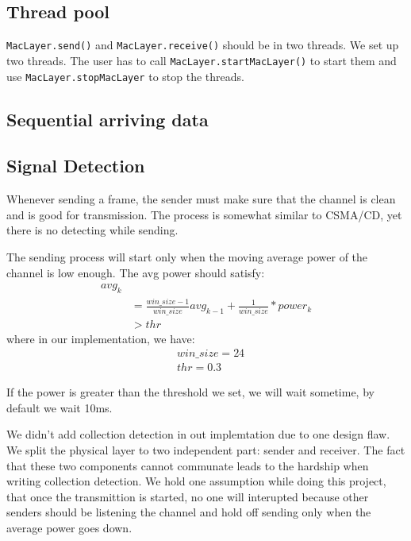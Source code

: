 \documentclass[conference,compsoc]{IEEEtran}
\begin{document}
	\subsection{Thread pool}\label{Thread pool}
		\lstinline{MacLayer.send()} and \lstinline{MacLayer.receive()} should be in two threads. We set up two threads. 
		The user has to call \lstinline{MacLayer.startMacLayer()} to start them and use \lstinline{MacLayer.stopMacLayer} to stop the threads.
	
	\subsection{Sequential arriving data}
	
	\subsection{Signal Detection}
		Whenever sending a frame, the sender must make sure that the channel is clean and is good for transmission.
		The process is somewhat similar to CSMA/CD, yet there is no detecting while sending.
		\par
		The sending process will start only when the moving average power of the channel is low enough. The avg power should satisfy:
		\begin{equation}\begin{aligned}
		avg_k \\
		& = 
			\frac{win\_size-1}{win\_size}avg_{k-1} + 
			\frac{1}{win\_size} * power_k \\
		& > thr
		\end{aligned}\end{equation}
		where in our implementation, we have:
		\begin{equation*}\begin{aligned} 
			& win\_size = 24 \\
			& thr = 0.3 
		\end{aligned}\end{equation*}
		\par
		If the power is	greater than the threshold we set, we will wait sometime, by default we wait 10ms.
		\par 
		We didn't add collection detection in out implemtation due to one design flaw. We split the physical layer to two independent part: sender and receiver. The fact that these two components cannot communate leads to the hardship when writing collection detection. We hold one assumption while doing this project, that once the transmittion is started, no one will interupted because other senders should be listening the channel and hold off sending only when the average power goes down.
\end{document}
